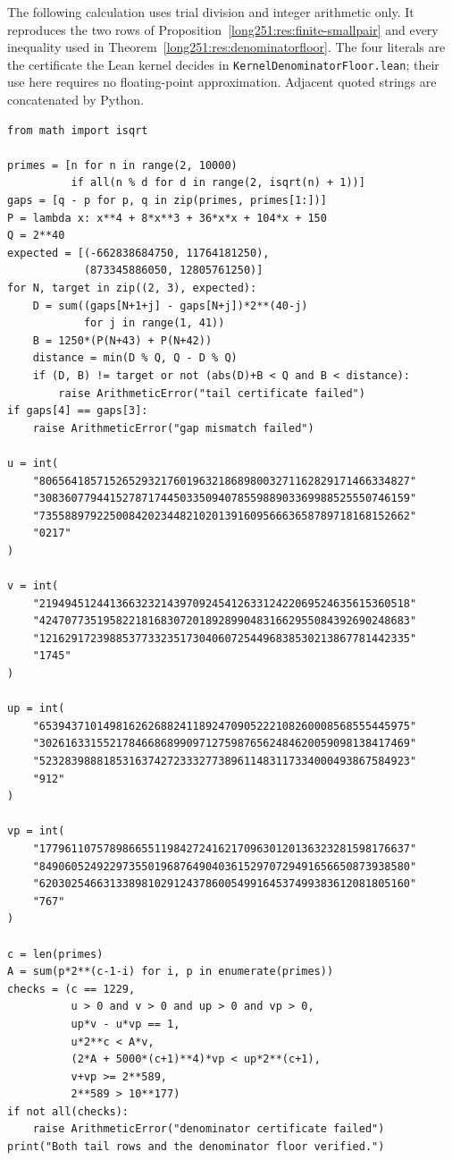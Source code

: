 \documentclass[11pt]{article}
\begin{document}
The following calculation uses trial division and integer arithmetic only.  It
reproduces the two rows of Proposition~\ref{long251:res:finite-smallpair} and every
inequality used in Theorem~\ref{long251:res:denominatorfloor}.  The four literals are
the certificate the Lean kernel decides in
\texttt{KernelDenominatorFloor.lean}; their use here requires no
floating-point approximation.  Adjacent quoted strings are concatenated by
Python.
{\footnotesize
\begin{verbatim}
from math import isqrt

primes = [n for n in range(2, 10000)
          if all(n % d for d in range(2, isqrt(n) + 1))]
gaps = [q - p for p, q in zip(primes, primes[1:])]
P = lambda x: x**4 + 8*x**3 + 36*x*x + 104*x + 150
Q = 2**40
expected = [(-662838684750, 11764181250),
            (873345886050, 12805761250)]
for N, target in zip((2, 3), expected):
    D = sum((gaps[N+1+j] - gaps[N+j])*2**(40-j)
            for j in range(1, 41))
    B = 1250*(P(N+43) + P(N+42))
    distance = min(D % Q, Q - D % Q)
    if (D, B) != target or not (abs(D)+B < Q and B < distance):
        raise ArithmeticError("tail certificate failed")
if gaps[4] == gaps[3]:
    raise ArithmeticError("gap mismatch failed")

u = int(
    "8065641857152652932176019632186898003271162829171466334827"
    "3083607794415278717445033509407855988903369988525550746159"
    "7355889792250084202344821020139160956663658789718168152662"
    "0217"
)

v = int(
    "2194945124413663232143970924541263312422069524635615360518"
    "4247077351958221816830720189289904831662955084392690248683"
    "1216291723988537733235173040607254496838530213867781442335"
    "1745"
)

up = int(
    "6539437101498162626882411892470905222108260008568555445975"
    "3026163315521784668689909712759876562484620059098138417469"
    "5232839888185316374272333277389611483117334000493867584923"
    "912"
)

vp = int(
    "1779611075789866551198427241621709630120136323281598176637"
    "8490605249229735501968764904036152970729491656650873938580"
    "6203025466313389810291243786005499164537499383612081805160"
    "767"
)

c = len(primes)
A = sum(p*2**(c-1-i) for i, p in enumerate(primes))
checks = (c == 1229,
          u > 0 and v > 0 and up > 0 and vp > 0,
          up*v - u*vp == 1,
          u*2**c < A*v,
          (2*A + 5000*(c+1)**4)*vp < up*2**(c+1),
          v+vp >= 2**589,
          2**589 > 10**177)
if not all(checks):
    raise ArithmeticError("denominator certificate failed")
print("Both tail rows and the denominator floor verified.")
\end{verbatim}
}
\end{document}
